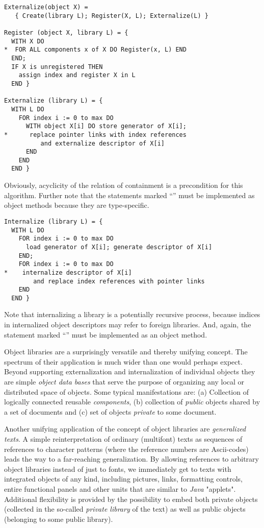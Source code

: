 {\small\begin{verbatim}
Externalize(object X) =
   { Create(library L); Register(X, L); Externalize(L) }

Register (object X, library L) = {
  WITH X DO
*  FOR ALL components x of X DO Register(x, L) END
  END;
  IF X is unregistered THEN
    assign index and register X in L
  END }

Externalize (library L) = {
  WITH L DO
    FOR index i := 0 to max DO
      WITH object X[i] DO store generator of X[i];
*      replace pointer links with index references
          and externalize descriptor of X[i]
      END
    END
  END }
\end{verbatim}}

Obviously, acyclicity of the relation of containment is a precondition
for this algorithm. Further note that the statements marked ``{\tt *}''
must be implemented as object methods because they are type-specific.


{\small\begin{verbatim}
Internalize (library L) = {
  WITH L DO
    FOR index i := 0 to max DO
      load generator of X[i]; generate descriptor of X[i]
    END;
    FOR index i := 0 to max DO
*    internalize descriptor of X[i]
        and replace index references with pointer links
    END
  END }
\end{verbatim}}

Note that internalizing a library is a potentially recursive process, because
indices in internalized object descriptors may refer to foreign libraries.
And, again, the statement marked ``{\tt *}'' must be implemented as
an object method.

\ein
Object libraries are a surprisingly versatile and thereby unifying concept.
The spectrum of their application is much wider than one would perhaps expect.
Beyond supporting externalization and internalization of individual objects
they are simple {\em object data bases\/} that serve the purpose of organizing
any local or distributed space of objects. Some typical manifestations are:
(a) Collection of logically connected reusable {\em components},
(b) collection of {\em public\/} objects shared by a set of
documents and (c) set of objects {\em private\/} to some document.


Another unifying application of the concept of object libraries are
{\em generalized texts}. A simple reinterpretation of ordinary (multifont)
texts as sequences of references to character patterns (where the reference
numbers are Ascii-codes) leads the way to a far-reaching generalization.
By allowing references to arbitrary object libraries instead of just to fonts,
we immediately get to texts with integrated objects of any kind, including
pictures, links, formatting controls, entire functional panels and other units
that are similar to {\em Java\/} "applets". Additional flexibility is provided
by the possibility to embed both private objects (collected in the so-called
{\em private library} of the text) as well as public objects (belonging
to some public library).

